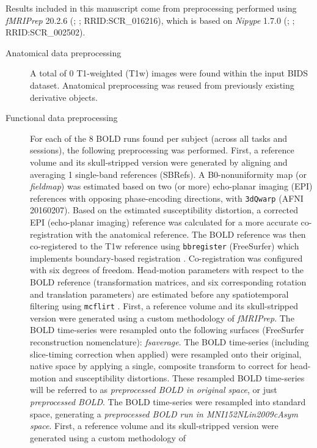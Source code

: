 \documentclass[]{article}
\date{}
\begin{document}
Results included in this manuscript come from preprocessing performed
using \emph{fMRIPrep} 20.2.6 (\citet{fmriprep1}; \citet{fmriprep2};
RRID:SCR\_016216), which is based on \emph{Nipype} 1.7.0
(\citet{nipype1}; \citet{nipype2}; RRID:SCR\_002502).

\begin{description}
\item[Anatomical data preprocessing]
A total of 0 T1-weighted (T1w) images were found within the input BIDS
dataset. Anatomical preprocessing was reused from previously existing
derivative objects.
\item[Functional data preprocessing]
For each of the 8 BOLD runs found per subject (across all tasks and
sessions), the following preprocessing was performed. First, a reference
volume and its skull-stripped version were generated by aligning and
averaging 1 single-band references (SBRefs). A B0-nonuniformity map (or
\emph{fieldmap}) was estimated based on two (or more) echo-planar
imaging (EPI) references with opposing phase-encoding directions, with
\texttt{3dQwarp} \citet{afni} (AFNI 20160207). Based on the estimated
susceptibility distortion, a corrected EPI (echo-planar imaging)
reference was calculated for a more accurate co-registration with the
anatomical reference. The BOLD reference was then co-registered to the
T1w reference using \texttt{bbregister} (FreeSurfer) which implements
boundary-based registration \citep{bbr}. Co-registration was configured
with six degrees of freedom. Head-motion parameters with respect to the
BOLD reference (transformation matrices, and six corresponding rotation
and translation parameters) are estimated before any spatiotemporal
filtering using \texttt{mcflirt} \citep[FSL 5.0.9,][]{mcflirt}. First, a
reference volume and its skull-stripped version were generated using a
custom methodology of \emph{fMRIPrep}. The BOLD time-series were
resampled onto the following surfaces (FreeSurfer reconstruction
nomenclature): \emph{fsaverage}. The BOLD time-series (including
slice-timing correction when applied) were resampled onto their
original, native space by applying a single, composite transform to
correct for head-motion and susceptibility distortions. These resampled
BOLD time-series will be referred to as \emph{preprocessed BOLD in
original space}, or just \emph{preprocessed BOLD}. The BOLD time-series
were resampled into standard space, generating a \emph{preprocessed BOLD
run in MNI152NLin2009cAsym space}. First, a reference volume and its
skull-stripped version were generated using a custom methodology of

\end{description}
\end{document}
